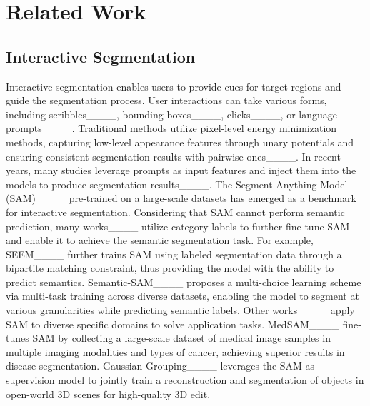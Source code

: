 \section{Related Work}
\label{sec:related}

\subsection{Interactive Segmentation}
Interactive segmentation enables users to provide cues for target regions and guide the segmentation process. User interactions can take various forms, including scribbles____, bounding boxes____, clicks____, or language prompts____. Traditional methods utilize pixel-level energy minimization methods, capturing low-level appearance features through unary potentials and ensuring consistent segmentation results with pairwise ones____. 
In recent years, many studies leverage prompts as input features and inject them into the models to produce segmentation results____. The Segment Anything Model (SAM)____ pre-trained on a large-scale datasets has emerged as a benchmark for interactive segmentation. 
Considering that SAM cannot perform semantic prediction, many works____ utilize category labels to further fine-tune SAM and enable it to achieve the semantic segmentation task. For example, SEEM____ further trains SAM using labeled segmentation data through a bipartite matching constraint, thus providing the model with the ability to predict semantics. Semantic-SAM____ proposes a multi-choice learning scheme via multi-task training across diverse datasets, enabling the model to segment at various granularities while predicting semantic labels.
Other works____ apply SAM to diverse specific domains to solve application tasks. MedSAM____ fine-tunes SAM by collecting a large-scale dataset of medical image samples in multiple imaging modalities and types of cancer, achieving superior results in disease segmentation.
Gaussian-Grouping____ leverages the SAM as supervision model to jointly train a reconstruction and segmentation of objects in open-world 3D scenes for high-quality 3D edit.


